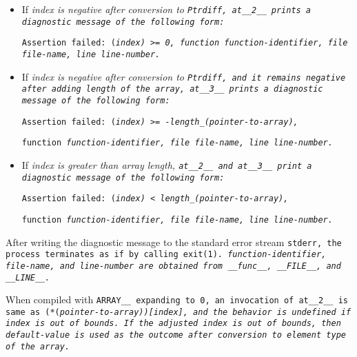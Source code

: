 \begin{itemize}

\item If \it{index} is negative after conversion to \tt{Ptrdiff},
\tt{at__2__} prints a diagnostic message of the following form:

\begin{center}
\tt{Assertion failed: (}\it{index}\tt{) >= 0, function}
\it{function-identifier}\tt{, file}
\it{file-name}\tt{, line}
\it{line-number}\tt{.}\\
\end{center}

\item If \it{index} is negative after conversion to \tt{Ptrdiff},
and it remains negative after adding length of the array,
\tt{at__3__} prints a diagnostic message of the following form:

\begin{center}
\tt{Assertion failed: (}\it{index}\tt{) >= -length_(}\it{pointer-to-array}\tt{),}

\tt{function} \it{function-identifier}\tt{,}
\tt{file} \it{file-name}\tt{,}
\tt{line} \it{line-number}\tt{.}
\end{center}

\item If \it{index} is greater than array length, \tt{at__2__} and
\tt{at__3__} print a diagnostic message of the following form:

\begin{center}
\tt{Assertion failed: (}\it{index}\tt{) < length_(}\it{pointer-to-array}\tt{),}

\tt{function} \it{function-identifier}\tt{,}
\tt{file} \it{file-name}\tt{,}
\tt{line} \it{line-number}\tt{.}
\end{center}

\end{itemize}

After writing the diagnostic message to the standard error stream \tt{stderr},
the process terminates as if by calling \tt{exit(1)}.
\it{function-identifier}, \it{file-name}, and \it{line-number}
are obtained from \tt{__func__}, \tt{__FILE__}, and \tt{__LINE__}.

When compiled with \tt{ARRAY__} expanding to \tt{0}, an invocation of
\tt{at__2__} is same as \tt{(*(}\it{pointer-to-array}\tt{))[}\it{index}\tt{]},
and the behavior is undefined if \it{index} is out of bounds.
If the adjusted index is out of bounds, then \it{default-value} is
used as the outcome after conversion to element type of the array.

